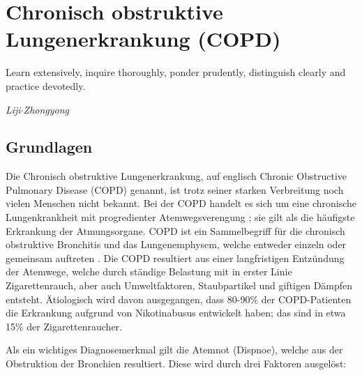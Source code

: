 \ifpdf
\graphicspath{{2_chronisch_obstruktive_lungenerkrankung/figures/PNG/}{2_chronisch_obstruktive_lungenerkrankung/figures/PDF/}{2_chronisch_obstruktive_lungenerkrankung/figures/}}
\else
    \graphicspath{{2_chronisch_obstruktive_lungenerkrankung/figures/EPS/}{2_chronisch_obstruktive_lungenerkrankung/figures/}}
\fi

\chapter{Chronisch obstruktive Lungenerkrankung (COPD)}
\label{copd}
\setlength{\epigraphwidth}{6.0cm}
\epigraph{Learn extensively, inquire thoroughly, ponder prudently, distinguish clearly and practice devotedly.}{\emph{Liji$\cdot$Zhongyong}}




\section{Grundlagen} %
\label{grundlagen}

Die Chronisch obstruktive Lungenerkrankung, auf englisch Chronic Obstructive Pulmonary Disease (COPD) genannt, ist trotz seiner starken Verbreitung noch vielen Menschen nicht bekannt.
Bei der COPD handelt es sich um eine chronische Lungenkrankheit mit progredienter Atemwegsverengung ; sie gilt als die häufigste Erkrankung der Atmungsorgane. COPD ist ein Sammelbegriff für die chronisch obstruktive Bronchitis und das Lungenemphysem, welche entweder einzeln oder gemeinsam auftreten \autocite[vgl.][153]{checkliste}.  Die COPD resultiert aus einer langfristigen Entzündung der Atemwege, welche durch ständige Belastung mit in erster Linie Zigarettenrauch, aber auch Umweltfaktoren, Staubpartikel und giftigen Dämpfen entsteht. Ätiologisch wird davon ausgegangen, dass 80-90\% der COPD-Patienten die Erkrankung aufgrund von Nikotinabusus entwickelt haben; das sind in etwa 15\% der Zigarettenraucher\autocite[vgl.][154]{lorenz2009}. 

Als ein wichtiges Diagnosemerkmal gilt die Atemnot (Dispnoe), welche aus der Obstruktion der Bronchien resultiert. Diese wird durch drei Faktoren ausgelöst: 


